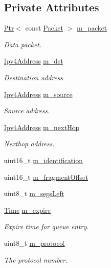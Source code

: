 \subsection*{Private Attributes}
\begin{DoxyCompactItemize}
\item 
\hyperlink{classns3_1_1Ptr}{Ptr}$<$ const \hyperlink{classns3_1_1Packet}{Packet} $>$ \hyperlink{classns3_1_1dsr_1_1DsrPassiveBuffEntry_a8b5513050b7e221ca4ca162c5d203924}{m\+\_\+packet}
\begin{DoxyCompactList}\small\item\em Data packet. \end{DoxyCompactList}\item 
\hyperlink{classns3_1_1Ipv4Address}{Ipv4\+Address} \hyperlink{classns3_1_1dsr_1_1DsrPassiveBuffEntry_a56a5c25f1a78e60d9f6a063d289ca2ef}{m\+\_\+dst}
\begin{DoxyCompactList}\small\item\em Destination address. \end{DoxyCompactList}\item 
\hyperlink{classns3_1_1Ipv4Address}{Ipv4\+Address} \hyperlink{classns3_1_1dsr_1_1DsrPassiveBuffEntry_ad712ad7f3db0141e74b08aacefc8ca07}{m\+\_\+source}
\begin{DoxyCompactList}\small\item\em Source address. \end{DoxyCompactList}\item 
\hyperlink{classns3_1_1Ipv4Address}{Ipv4\+Address} \hyperlink{classns3_1_1dsr_1_1DsrPassiveBuffEntry_a86547a8a216d4f38bd210828d808e40d}{m\+\_\+next\+Hop}
\begin{DoxyCompactList}\small\item\em Nexthop address. \end{DoxyCompactList}\item 
uint16\+\_\+t \hyperlink{classns3_1_1dsr_1_1DsrPassiveBuffEntry_a80372133d49515466112639f2e82c375}{m\+\_\+identification}
\item 
uint16\+\_\+t \hyperlink{classns3_1_1dsr_1_1DsrPassiveBuffEntry_a1fbd23f8a2937381f786a3708cafa3f9}{m\+\_\+fragment\+Offset}
\item 
uint8\+\_\+t \hyperlink{classns3_1_1dsr_1_1DsrPassiveBuffEntry_a4e40fbd7e45546cb2b36e129fa524b2c}{m\+\_\+segs\+Left}
\item 
\hyperlink{classns3_1_1Time}{Time} \hyperlink{classns3_1_1dsr_1_1DsrPassiveBuffEntry_af64477899c96ab65a190d75e378cfc90}{m\+\_\+expire}
\begin{DoxyCompactList}\small\item\em Expire time for queue entry. \end{DoxyCompactList}\item 
uint8\+\_\+t \hyperlink{classns3_1_1dsr_1_1DsrPassiveBuffEntry_a096b04f8db4f744269fe3e30a232dea8}{m\+\_\+protocol}
\begin{DoxyCompactList}\small\item\em The protocol number. \end{DoxyCompactList}\end{DoxyCompactItemize}


